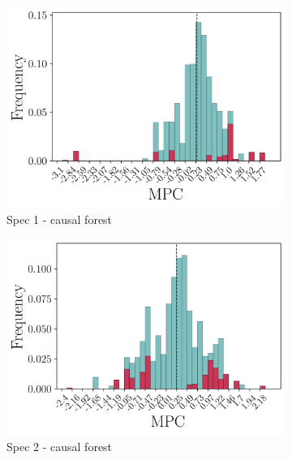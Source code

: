 \begin{figure}[t]
    \begin{subfigure}{0.33\linewidth}
        \includegraphics[width=\linewidth]{figures/distributions/spec1_cf_chNDexp.png}
        \caption{Spec 1 - causal forest}
    \end{subfigure}\hfill
    \begin{subfigure}{0.33\linewidth}
        \includegraphics[width=\linewidth]{figures/distributions/spec2_cf_chNDexp.png}
        \caption{Spec 2 - causal forest}
    \end{subfigure}\hfill
    \begin{subfigure}{0.33\linewidth}

\end{subfigure}
\end{figure}
